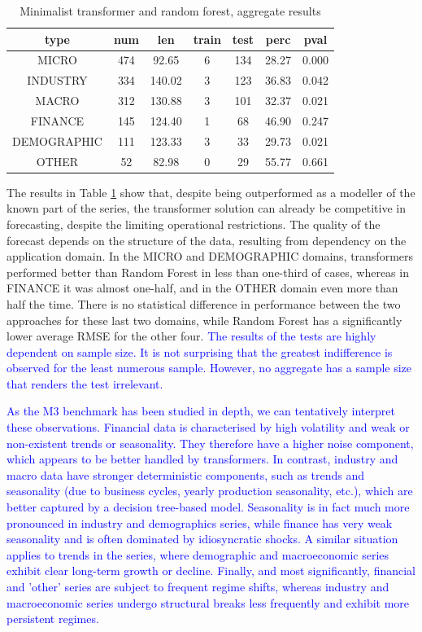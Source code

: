 \documentclass[algorithms,article,submit,pdftex,moreauthors]{Definitions/mdpi}
\begin{document}
\begin{table}[H]
\caption{Minimalist transformer and random forest, aggregate results}
\label{tab:aggregate}
\centering
\begin{tabular}{ccccccc}
\toprule
{\bf type} & {\bf num} & len & {\bf train} & {\bf test} & {\bf perc} & {\bf pval}\\
\midrule
MICRO 		& 474 &  92.65 & 6 & 134 & 28.27 & 0.000\\
INDUSTRY 	& 334 & 140.02 & 3 & 123 & 36.83 & 0.042\\
MACRO 		& 312 & 130.88 & 3 & 101 & 32.37 & 0.021\\
FINANCE 	   & 145 & 124.40 & 1 &  68 & 46.90 & 0.247\\
DEMOGRAPHIC & 111 & 123.33 & 3 &  33 & 29.73 & 0.021\\
OTHER 		&  52 &  82.98 & 0 &  29 & 55.77 & 0.661\\
\bottomrule
\end{tabular}
\end{table}

The results in Table \ref{tab:aggregate}  show that, despite being outperformed as a modeller of the known part of the series, the transformer solution can already be competitive in forecasting, despite the limiting operational restrictions. The quality of the forecast depends on the structure of the data, resulting from dependency on the application domain. In the MICRO and DEMOGRAPHIC domains, transformers performed better than Random Forest in less than one-third of cases, whereas in FINANCE it was almost one-half, and in the OTHER domain even more than half the time. There is no statistical difference in performance between the two approaches for these last two domains, while Random Forest has a significantly lower average RMSE for the other four. \textcolor{blue}{The results of the tests are highly dependent on sample size. It is not surprising that the greatest indifference is observed for the least numerous sample. However, no aggregate has a sample size that renders the test irrelevant.}

\textcolor{blue}{As the M3 benchmark has been studied in depth, we can tentatively interpret these observations. Financial data is characterised by high volatility and weak or non-existent trends or seasonality. They therefore have a higher noise component, which appears to be better handled by transformers. In contrast, industry and macro data have stronger deterministic components, such as trends and seasonality (due to business cycles, yearly production seasonality, etc.), which are better captured by a decision tree-based model.
Seasonality is in fact much more pronounced in industry and demographics series, while finance has very weak seasonality and is often dominated by idiosyncratic shocks. A similar situation applies to trends in the series, where demographic and macroeconomic series exhibit clear long-term growth or decline. Finally, and most significantly, financial and 'other' series are subject to frequent regime shifts, whereas industry and macroeconomic series undergo structural breaks less frequently and exhibit more persistent regimes.}
\end{document}
